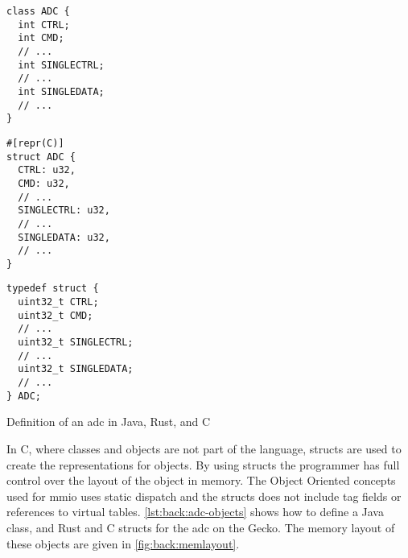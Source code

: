 \begin{listing}[H]
  \centering
  \begin{minipage}{0.31\textwidth}
  \begin{listing}
    \begin{verbatim}
class ADC {
  int CTRL;
  int CMD;
  // ...
  int SINGLECTRL;
  // ...
  int SINGLEDATA;
  // ...
}
    \end{verbatim}
  \end{listing}
  \end{minipage}
  \hfill
  \begin{minipage}{0.31\textwidth}
  \begin{listing}
    \begin{verbatim}
#[repr(C)]
struct ADC {
  CTRL: u32,
  CMD: u32,
  // ...
  SINGLECTRL: u32,
  // ...
  SINGLEDATA: u32,
  // ...
}
    \end{verbatim}
  \end{listing}
  \end{minipage}
  \hfill
  \begin{minipage}{0.31\textwidth}
  \begin{listing}
    \begin{verbatim}
typedef struct {
  uint32_t CTRL;
  uint32_t CMD;
  // ...
  uint32_t SINGLECTRL;
  // ...
  uint32_t SINGLEDATA;
  // ...
} ADC;
    \end{verbatim}
  \end{listing}
  \end{minipage}

  \caption{Definition of an \gls{adc} in Java, Rust, and C}
  \label{lst:back:adc-objects}
\end{listing}


In C, where classes and objects are not part of the language, structs are used to create the representations for objects.
By using structs the programmer has full control over the layout of the object in memory.
The Object Oriented concepts used for \gls{mmio} uses static dispatch and the structs does not include tag fields or references to virtual tables.
\autoref{lst:back:adc-objects} shows how to define a Java class, and Rust and C structs for the \gls{adc} on the Gecko.
The memory layout of these objects are given in \autoref{fig:back:memlayout}.

